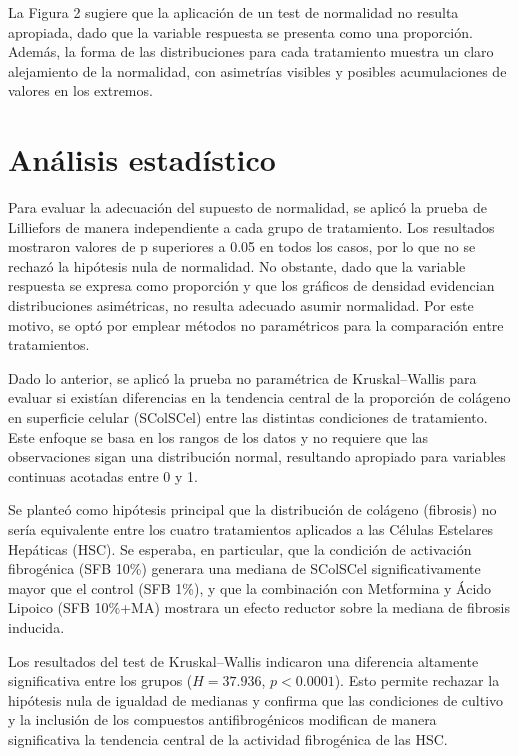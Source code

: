 \documentclass[
  10pt,
]{article}
\begin{document}
La Figura 2 sugiere que la aplicación de un test de normalidad no
resulta apropiada, dado que la variable respuesta se presenta como una
proporción. Además, la forma de las distribuciones para cada tratamiento
muestra un claro alejamiento de la normalidad, con asimetrías visibles y
posibles acumulaciones de valores en los extremos.

\section{Análisis estadístico}\label{anuxe1lisis-estaduxedstico}

Para evaluar la adecuación del supuesto de normalidad, se aplicó la
prueba de Lilliefors de manera independiente a cada grupo de
tratamiento. Los resultados mostraron valores de p superiores a 0.05 en
todos los casos, por lo que no se rechazó la hipótesis nula de
normalidad. No obstante, dado que la variable respuesta se expresa como
proporción y que los gráficos de densidad evidencian distribuciones
asimétricas, no resulta adecuado asumir normalidad. Por este motivo, se
optó por emplear métodos no paramétricos para la comparación entre
tratamientos.

Dado lo anterior, se aplicó la prueba no paramétrica de Kruskal--Wallis
para evaluar si existían diferencias en la tendencia central de la
proporción de colágeno en superficie celular (SColSCel) entre las
distintas condiciones de tratamiento. Este enfoque se basa en los rangos
de los datos y no requiere que las observaciones sigan una distribución
normal, resultando apropiado para variables continuas acotadas entre 0 y
1.

Se planteó como hipótesis principal que la distribución de colágeno
(fibrosis) no sería equivalente entre los cuatro tratamientos aplicados
a las Células Estelares Hepáticas (HSC). Se esperaba, en particular, que
la condición de activación fibrogénica (SFB 10\%) generara una mediana
de SColSCel significativamente mayor que el control (SFB 1\%), y que la
combinación con Metformina y Ácido Lipoico (SFB 10\%+MA) mostrara un
efecto reductor sobre la mediana de fibrosis inducida.

Los resultados del test de Kruskal--Wallis indicaron una diferencia
altamente significativa entre los grupos (\(H = 37.936\),
\(p < 0.0001\)). Esto permite rechazar la hipótesis nula de igualdad de
medianas y confirma que las condiciones de cultivo y la inclusión de los
compuestos antifibrogénicos modifican de manera significativa la
tendencia central de la actividad fibrogénica de las HSC.
\end{document}
